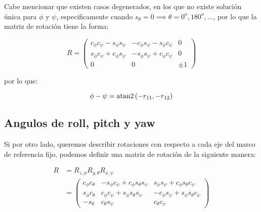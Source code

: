 \begin{multicols*}{2}
            Cabe mencionar que existen casos degenerados, en los que no existe solución única para $\phi$ y $\psi$, especificamente cuando $s_{\theta} = 0 \implies \theta = 0^o, 180^o, \dots$, por lo que la matriz de rotación tiene la forma:

            \begin{equation*}
                R =
                \begin{pmatrix}
                    c_{\phi} c_{\psi} - s_{\phi} s_{\psi} & - c_{\phi} s_{\psi} - s_{\phi} c_{\psi} & 0 \\
                    s_{\phi} c_{\psi} + c_{\phi} s_{\psi} & - s_{\phi} s_{\psi} + c_{\phi} c_{\psi} & 0 \\
                    0 & 0 & \pm 1
                \end{pmatrix}
            \end{equation*}

            por lo que:

            \begin{equation}
                \phi - \psi = \operatorname{atan2}{(-r_{11}, -r_{12})}
            \end{equation}


        \subsection{Angulos de roll, pitch y yaw}

            Si por otro lado, queremos describir rotaciones con respecto a cada eje del marco de referencia fijo, podemos definir una matriz de rotación de la siguiente manera:

            \begin{align}
                R &= R_{z, \phi} R_{y, \theta} R_{x, \psi} \nonumber \\
                &=
                \begin{pmatrix}
                    c_{\phi} c_{\theta} & -s_{\phi} c_{\psi} + c_{\phi} s_{\theta} s_{\psi} & s_{\phi} s_{\psi} + c_{\phi} s_{\theta} c_{\psi} \\
                    s_{\phi} c_{\theta} & c_{\phi} c_{\psi} + s_{\phi} s_{\theta} s_{\psi} & -c_{\phi} s_{\psi} + s_{\phi} s_{\theta} c_{\psi} \\
                    - s_{\theta} & c_{\theta} s_{\psi} & c_{\theta} c_{\psi}
                \end{pmatrix}
            \end{align}


\end{multicols*}
